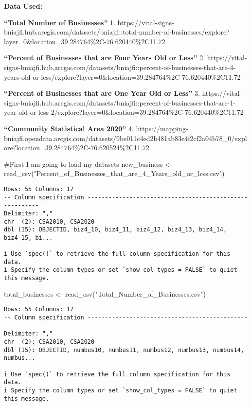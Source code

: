 \documentclass[
  letterpaper,
  DIV=11,
  numbers=noendperiod]{scrartcl}
\newenvironment{Shaded}{\begin{snugshade}}{\end{snugshade}}
\newcommand{\CommentTok}[1]{\textcolor[rgb]{0.37,0.37,0.37}{#1}}
\newcommand{\FunctionTok}[1]{\textcolor[rgb]{0.28,0.35,0.67}{#1}}
\newcommand{\NormalTok}[1]{\textcolor[rgb]{0.00,0.23,0.31}{#1}}
\newcommand{\OtherTok}[1]{\textcolor[rgb]{0.00,0.23,0.31}{#1}}
\newcommand{\StringTok}[1]{\textcolor[rgb]{0.13,0.47,0.30}{#1}}
\begin{document}
\textbf{Data Used:}

\textbf{``Total Number of Businesses''} 1.
https://vital-signs-bniajfi.hub.arcgis.com/datasets/bniajfi::total-number-of-businesses/explore?layer=0\&location=39.284764\%2C-76.620440\%2C11.72

\textbf{``Percent of Businesses that are Four Years Old or Less''} 2.
https://vital-signs-bniajfi.hub.arcgis.com/datasets/bniajfi::percent-of-businesses-that-are-4-years-old-or-less/explore?layer=0\&location=39.284764\%2C-76.620440\%2C11.72

\textbf{``Percent of Businesses that are One Year Old or Less''} 3.
https://vital-signs-bniajfi.hub.arcgis.com/datasets/bniajfi::percent-of-businesses-that-are-1-year-old-or-less-2/explore?layer=0\&location=39.284764\%2C-76.620440\%2C11.72

\textbf{``Community Statistical Area 2020''} 4.
https://mapping-bniajfi.opendata.arcgis.com/datasets/9be011c4ed2b481ab83e4f2cf2a04b78\_0/explore?location=39.284764\%2C-76.620524\%2C11.72

\begin{Shaded}
\begin{Highlighting}[]
\CommentTok{\#First I am going to load my datasets }
\NormalTok{new\_business }\OtherTok{\textless{}{-}} \FunctionTok{read\_csv}\NormalTok{(}\StringTok{"Percent\_of\_Businesses\_that\_are\_4\_Years\_old\_or\_less.csv"}\NormalTok{)}
\end{Highlighting}
\end{Shaded}

\begin{verbatim}
Rows: 55 Columns: 17
-- Column specification --------------------------------------------------------
Delimiter: ","
chr  (2): CSA2010, CSA2020
dbl (15): OBJECTID, biz4_10, biz4_11, biz4_12, biz4_13, biz4_14, biz4_15, bi...

i Use `spec()` to retrieve the full column specification for this data.
i Specify the column types or set `show_col_types = FALSE` to quiet this message.
\end{verbatim}

\begin{Shaded}
\begin{Highlighting}[]
\NormalTok{total\_businesses }\OtherTok{\textless{}{-}} \FunctionTok{read\_csv}\NormalTok{(}\StringTok{"Total\_Number\_of\_Businesses.csv"}\NormalTok{)}
\end{Highlighting}
\end{Shaded}

\begin{verbatim}
Rows: 55 Columns: 17
-- Column specification --------------------------------------------------------
Delimiter: ","
chr  (2): CSA2010, CSA2020
dbl (15): OBJECTID, numbus10, numbus11, numbus12, numbus13, numbus14, numbus...

i Use `spec()` to retrieve the full column specification for this data.
i Specify the column types or set `show_col_types = FALSE` to quiet this message.
\end{verbatim}
\end{document}
